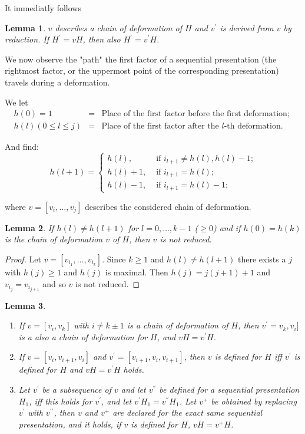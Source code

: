 \documentclass{article}
\newtheorem{lemma}{Lemma}
\begin{document}
It immediatly follows 

\begin{lemma}
 $v$ describes a chain of deformation of $H$ and $v^{\prime}$ is derived from $v$ by reduction. If $H^{\prime} = vH$, then also $H^{\prime} = v^{\prime}H$.
\end{lemma}

We now observe the "path" the first factor of a sequential presentation (the rightmost factor, or the uppermost point of the corresponding presentation) travels during a deformation.

We let
\[
  \begin{array}{rcl}
    h(0) =  1 & = & \mbox{Place of the first factor before the first deformation; }\\
    h(l) (0 \leq l \le j) & = & \mbox{Place of the first factor after the $l$-th deformation.}
  \end{array}
\]

And find:
\[
  h(l+1)= \begin{cases}
           h(l),     & \mbox{ if $i_{l+1} \neq h(l), h(l) - 1$;} \\
           h(l) + 1, & \mbox{ if $i_{l+1} = h(l)$;} \\
           h(l) -1,  & \mbox{ if $i_{l+1} = h(l) - 1$;}
          \end{cases}
\]

where $v = [v_i, \ldots, v_j]$ describes the considered chain of deformation. 

\begin{lemma}
  If $h(l) \neq h(l + 1)$ for $l = 0, \ldots, k - 1$ ($\geq 0$) and if $h(0) = h(k)$ is the chain of deformation $v$ of $H$, then $v$ is not reduced. 
\end{lemma}

\begin{proof}
  Let $v = [v_{i_1}, \ldots , v_{i_k}]$. Since $k \geq 1$ and $h(l) \neq h(l + 1)$ there exists a $j$ with $h(j) \geq 1$ and $h(j)$ is maximal. Then $h(j) = j(j + 1) + 1$ and $v_{i_j} = v_{i_{j+1}}$ and so $v$ is not reduced.
\end{proof}

\begin{lemma}
  \begin{enumerate}
    \item If $v = [v_i, v_k]$ with $i \neq k \pm 1$ is a chain of deformation of $H$, then $v^{\prime} = v_k, v_i]$ is a also a chain of deformation for $H$, and $vH =v^{\prime}H$.
    \item If $v = [v_i, v_{i+1}, v_i]$ and $v^{\prime}=[v_{i+1}, v_i, v_{i+1}]$, then $v$ is defined for $H$ iff $v^{\prime}$ is defined for $H$ and $vH = v^{\prime}H$ holds.
    \item Let $v^{\prime}$ be a subsequence of $v$ and let $v^{''}$ be defined for a sequential presentation $H_1$, iff this holds for $v^{\prime}$, and let $v^{\prime}H_1 = v^{''} H_1$. 
          Let $v^{+}$ be obtained by replacing $v^{\prime}$ with $v^{\prime \prime}$, then $v$ and $v^{+}$ are declared for the exact same sequential presentation, and it holds, 
          if $v$ is defined for $H$, $v H = v ^{+} H$.
  \end{enumerate}
\end{lemma}
\end{document}
